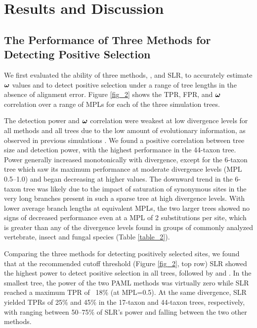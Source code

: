 \documentclass{article}
\begin{document}
\section*{Results and Discussion}
\subsection*{The Performance of Three Methods for Detecting \Sw Positive Selection}
We first evaluated the ability of three \sw methods, \mtwo,
\meight and SLR, to accurately estimate \sw $\bm{\omega}$ values and to
detect positive selection under a range of tree lengths in the absence
of alignment error. Figure \ref{fig_2} shows the TPR, FPR, \tpr{} and \sw $\bm{\omega}$
correlation over a range of MPLs for each of the three simulation
trees.

The detection power and $\bm{\omega}$ correlation were weakest at low
divergence levels for all methods and all trees due to the low amount
of evolutionary information, as observed in previous simulations
\citep{Anisimova2002Accuracy}. We found a positive correlation between
tree size and detection power, with the highest performance in the
44-taxon tree. Power generally increased monotonically with
divergence, except for the 6-taxon tree which saw its maximum
performance at moderate divergence levels (MPL 0.5--1.0) and began
decreasing at higher values. The downward trend in the 6-taxon tree
was likely due to the impact of saturation of synonymous sites in the
very long branches present in such a sparse tree at high divergence
levels. With lower average branch lengths at equivalent MPLs, the two
larger trees showed no signs of decreased performance even at a MPL of
2 substitutions per site, which is greater than any of the divergence
levels found in groups of commonly analyzed vertebrate, insect and
fungal species (Table \ref{table_2}).

Comparing the three methods for detecting positively selected sites, we found that at the
recommended cutoff threshold (Figure \ref{fig_2}, top row) SLR showed
the highest power to detect positive selection in all trees, followed
by \meight and \mtwo. In the smallest tree, the power of the two
PAML methods was virtually zero while SLR reached a maximum TPR of ~18\%
(at MPL=0.5). At the same divergence, SLR yielded TPRs of 25\% and 45\%
in the 17-taxon and 44-taxon trees, respectively, with \mtwo ranging
between 50--75\% of SLR's power and \meight falling between the two
other methods.
\end{document}

